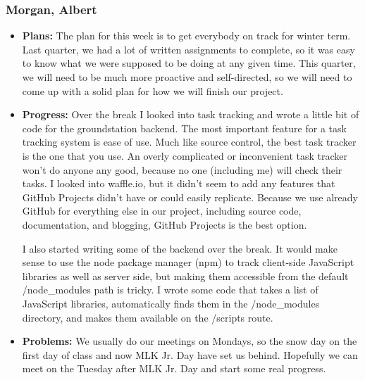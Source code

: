 \documentclass[10pt,draftclsnofoot,onecolumn]{IEEEtran}
\begin{document}
\subsubsection{Morgan, Albert}
\begin{itemize}
	\item \textbf{Plans: }
	The plan for this week is to get everybody on track for winter term. Last quarter, we had a lot of written assignments to complete, so it was easy to know what we were supposed to be doing at any given time. This quarter, we will need to be much more proactive and self-directed, so we will need to come up with a solid plan for how we will finish our project.
	\item \textbf{Progress: }
	Over the break I looked into task tracking and wrote a little bit of code for the groundstation backend. The most important feature for a task tracking system is ease of use. Much like source control, the best task tracker is the one that you use. An overly complicated or inconvenient task tracker won't do anyone any good, because no one (including me) will check their tasks. I looked into waffle.io, but it didn't seem to add any features that GitHub Projects didn't have or could easily replicate. Because we use already GitHub for everything else in our project, including source code, documentation, and blogging, GitHub Projects is the best option.

	I also started writing some of the backend over the break. It would make sense to use the node package manager (npm) to track client-side JavaScript libraries as well as server side, but making them accessible from the default /node\_modules path is tricky. I wrote some code that takes a list of JavaScript libraries, automatically finds them in the /node\_modules directory, and makes them available on the /scripts route.
	\item \textbf{Problems: }
	We usually do our meetings on Mondays, so the snow day on the first day of class and now MLK Jr. Day have set us behind. Hopefully we can meet on the Tuesday after MLK Jr. Day and start some real progress.
\end{itemize}
\end{document}
